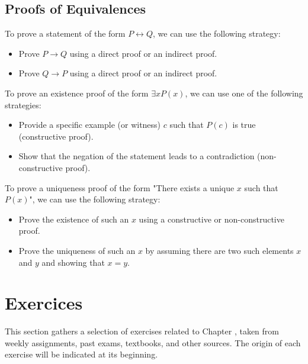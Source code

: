 \subsection{Proofs of Equivalences}
To prove a statement of the form $P \leftrightarrow Q$, we can use the following strategy:
\begin{itemize}[itemsep=1pt,label=$\circ$]
    \item Prove $P \to Q$ using a direct proof or an indirect proof.
    \item Prove $Q \to P$ using a direct proof or an indirect proof.
\end{itemize}
To prove an existence proof of the form $\exists x P(x)$, we can use one of the following strategies:
\begin{itemize}[itemsep=1pt,label=$\circ$]
    \item Provide a specific example (or witness) $c$ such that $P(c)$ is true (constructive proof).
    \item Show that the negation of the statement leads to a contradiction (non-constructive proof).
\end{itemize}
To prove a uniqueness proof of the form "There exists a unique $x$ such that $P(x)$", we can use the following strategy:
\begin{itemize}[itemsep=1pt,label=$\circ$]
    \item Prove the existence of such an $x$ using a constructive or non-constructive proof.
    \item Prove the uniqueness of such an $x$ by assuming there are two such elements $x$ and $y$ and showing that $x = y$.
\end{itemize}

\section{Exercices}
This section gathers a selection of exercises related to Chapter \thechapter, taken from weekly assignments, past exams, textbooks, and other sources. The origin of each exercise will be indicated at its beginning.